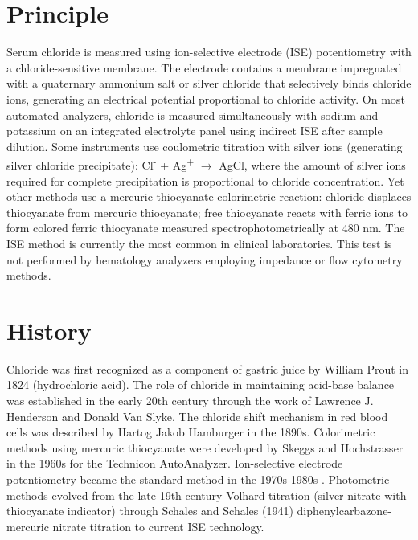 \section*{Principle}
Serum chloride is measured using ion-selective electrode (ISE) potentiometry with a chloride-sensitive membrane. The electrode contains a membrane impregnated with a quaternary ammonium salt or silver chloride that selectively binds chloride ions, generating an electrical potential proportional to chloride activity. On most automated analyzers, chloride is measured simultaneously with sodium and potassium on an integrated electrolyte panel using indirect ISE after sample dilution. Some instruments use coulometric titration with silver ions (generating silver chloride precipitate): Cl\textsuperscript{-} + Ag\textsuperscript{+} $\rightarrow$ AgCl, where the amount of silver ions required for complete precipitation is proportional to chloride concentration. Yet other methods use a mercuric thiocyanate colorimetric reaction: chloride displaces thiocyanate from mercuric thiocyanate; free thiocyanate reacts with ferric ions to form colored ferric thiocyanate measured spectrophotometrically at 480 nm. The ISE method is currently the most common in clinical laboratories. This test is not performed by hematology analyzers employing impedance or flow cytometry methods.

\section*{History}
Chloride was first recognized as a component of gastric juice by William Prout in 1824 (hydrochloric acid). The role of chloride in maintaining acid-base balance was established in the early 20th century through the work of Lawrence J. Henderson and Donald Van Slyke. The chloride shift mechanism in red blood cells was described by Hartog Jakob Hamburger in the 1890s. Colorimetric methods using mercuric thiocyanate were developed by Skeggs and Hochstrasser in the 1960s for the Technicon AutoAnalyzer. Ion-selective electrode potentiometry became the standard method in the 1970s-1980s \cite{tietz2023textbook}. Photometric methods evolved from the late 19th century Volhard titration (silver nitrate with thiocyanate indicator) through Schales and Schales (1941) diphenylcarbazone-mercuric nitrate titration to current ISE technology.


